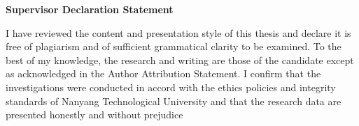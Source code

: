 \begin{titlepage}

\begin{center}
\Large{\bf{Supervisor Declaration Statement}}
\end{center}

\vspace{0.2in}

\begin{spacing}{2}
I have reviewed the content and presentation style of this thesis and declare it is free of plagiarism and of sufficient grammatical clarity to be examined. To the best of my knowledge, the research and writing are those of the candidate except as acknowledged in the Author Attribution Statement. I confirm that the investigations were conducted in accord with the ethics policies and integrity standards of Nanyang Technological University and that the research data are presented honestly and without prejudice
\end{spacing}

\vspace{2.5cm}

\begin{center}
	\makebox[4cm]{\dotfill}  \hfill \makebox[4cm]{\dotfill}\\
	      \hfill {}
\end{center}
\end{titlepage}
\newpage